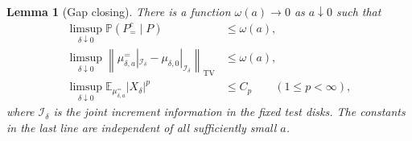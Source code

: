 \documentclass[11pt]{article}
\newcommand{\E}{\mathbb E}
\newcommand{\Prob}{\mathbb P}
\newcommand{\TV}{\mathrm{TV}}
\newtheorem{lemma}[theorem]{Lemma}
\theoremstyle{definition}
\theoremstyle{remark}
\numberwithin{equation}{section}
\begin{document}
\begin{lemma}[Gap closing]\label{pins:gap-closing}
There is a function $\omega(a)\to0$ as $a\downarrow0$ such that
\begin{align}
 \limsup_{\delta\downarrow0}
       \Prob(P_=^c\mid P)&\le\omega(a),
       \label{pins:offset-synchronization}\\
 \limsup_{\delta\downarrow0}
 \left\|\mu_{\delta,a}^{=}|_{\mathcal I_\delta}
              -\mu_{\delta,0}|_{\mathcal I_\delta}\right\|_{\TV}
       &\le\omega(a),\label{pins:increment-tv}\\
 \limsup_{\delta\downarrow0}
       \E_{\mu_{\delta,a}^{=}}|X_\delta|^p
       &\le C_p\qquad(1\le p<\infty),
       \label{pins:uniform-common-moments}
\end{align}
where $\mathcal I_\delta$ is the joint increment information in the
fixed test disks.  The constants in the last line are independent of
all sufficiently small $a$.
\end{lemma}
\end{document}
